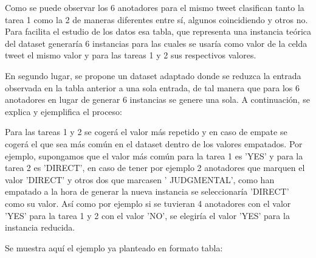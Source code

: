 Como se puede observar los 6 anotadores para el mismo tweet clasifican tanto la tarea 1 como la 2 de maneras diferentes entre sí, algunos coincidiendo y otros no. Para facilita el estudio de los datos esa tabla, que representa una instancia teórica del dataset generaría 6 instancias para las cuales se usaría como valor de la celda tweet el mismo valor y para las tareas 1 y 2 sus respectivos valores. 

En segundo lugar, se propone un dataset adaptado donde se reduzca la entrada observada en la tabla anterior a una sola entrada, de tal manera que para los 6 anotadores en lugar de generar 6 instancias se genere una sola. A continuación, se explica y ejemplifica el proceso:

Para las tareas 1 y 2 se cogerá el valor más repetido y en caso de empate se cogerá el que sea más común en el dataset dentro de los valores empatados. Por ejemplo, supongamos que el valor más común para la tarea 1 es 'YES' y para la tarea 2 es 'DIRECT', en caso de tener por ejemplo 2 anotadores que marquen el valor 'DIRECT' y otros dos que marcasen ' JUDGMENTAL', como han empatado a la hora de generar la nueva instancia se seleccionaría 'DIRECT' como su valor. Así como por ejemplo si se tuvieran 4 anotadores con el valor 'YES' para la tarea 1 y 2 con el valor 'NO', se elegiría el valor 'YES' para la instancia reducida.

Se muestra aquí el ejemplo ya planteado en formato tabla:


